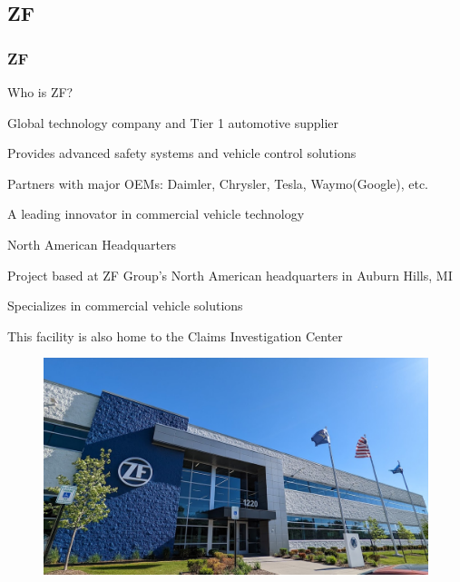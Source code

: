 \documentclass[8pt,compress,aspectratio=169]{beamer}
\begin{document}
\subsection{ZF}
\begin{frame}
  \frametitle{ZF}
  \begin{minipage}{0.45\textwidth}
    \begin{block}{Who is ZF?}
      \begin{itemize}
          \small {
            \item Global technology company and Tier 1 automotive supplier
            \item Provides advanced safety systems and vehicle control solutions
            \item Partners with major OEMs: Daimler, Chrysler, Tesla, Waymo(Google), etc.
            \item A leading innovator in commercial vehicle technology
          }
      \end{itemize}
    \end{block}
    \begin{block}{North American Headquarters}
      \begin{itemize}
          \small {
            \item Project based at ZF Group's North American headquarters in Auburn Hills, MI
            \item Specializes in commercial vehicle solutions
            \item This facility is also home to the Claims Investigation Center
            }
      \end{itemize}
    \end{block}
  \end{minipage}
  \hfill
  \begin{minipage}{0.45\textwidth}
    \begin{figure}
      \includegraphics[width=\textwidth]{assets/misc/zf-office.jpg}

\end{figure}
\end{minipage}
\end{frame}
\end{document}
